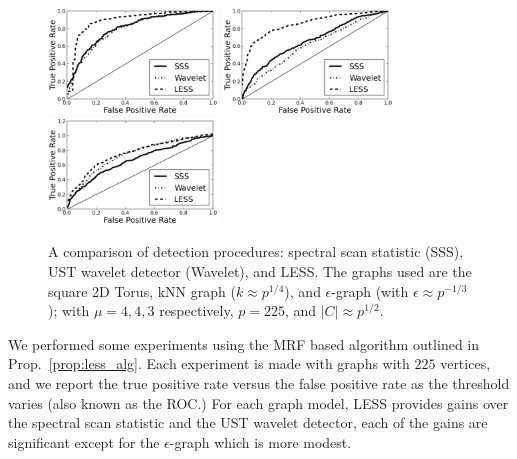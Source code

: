 \begin{figure}[t]
\begin{center}
\includegraphics[width=4.5cm]{tor_n=225_mu=4.eps}
\includegraphics[width=4.5cm]{knn_n=225_mu=4.eps}
\includegraphics[width=4.5cm]{eps_n=225_mu=3.eps}
\end{center}
\caption{A comparison of detection procedures: spectral scan statistic (SSS), UST wavelet detector (Wavelet), and LESS.  The graphs used are the square 2D Torus, kNN graph ($k \approx p^{1/4}$), and $\epsilon$-graph (with $\epsilon \approx p^{-1/3}$); with $\mu = 4,4,3$ respectively, $p = 225$, and $|C| \approx p^{1/2}$.}
\vspace{-.2cm}
\end{figure}
We performed some experiments using the MRF based algorithm outlined in Prop.~\ref{prop:less_alg}.
Each experiment is made with graphs with $225$ vertices, and we report the true positive rate versus the false positive rate as the threshold varies (also known as the ROC.)
For each graph model, LESS provides gains over the spectral scan statistic\cite{sharpnack2012changepoint} and the UST wavelet detector\cite{sharpnack2012detecting}, each of the gains are significant except for the $\epsilon$-graph which is more modest.
\vspace{-.2cm}
